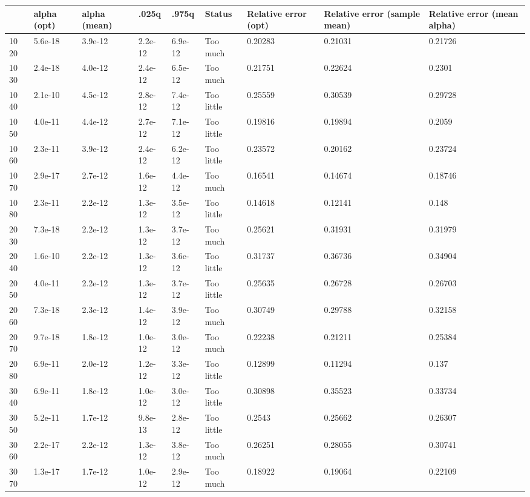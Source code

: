 \begin{tabular}{lllllllll}
& alpha (opt) & alpha (mean) & .025q & .975q & Status & Relative error (opt) & Relative error (sample mean) & Relative error (mean alpha) \\ 
\hline 
10  20 & 5.6e-18 & 3.9e-12 & 2.2e-12 & 6.9e-12 & Too much & 0.20283 & 0.21031 & 0.21726 \\ \hline 
10  30 & 2.4e-18 & 4.0e-12 & 2.4e-12 & 6.5e-12 & Too much & 0.21751 & 0.22624 & 0.2301 \\ \hline 
10  40 & 2.1e-10 & 4.5e-12 & 2.8e-12 & 7.4e-12 & Too little & 0.25559 & 0.30539 & 0.29728 \\ \hline 
10  50 & 4.0e-11 & 4.4e-12 & 2.7e-12 & 7.1e-12 & Too little & 0.19816 & 0.19894 & 0.2059 \\ \hline 
10  60 & 2.3e-11 & 3.9e-12 & 2.4e-12 & 6.2e-12 & Too little & 0.23572 & 0.20162 & 0.23724 \\ \hline 
10  70 & 2.9e-17 & 2.7e-12 & 1.6e-12 & 4.4e-12 & Too much & 0.16541 & 0.14674 & 0.18746 \\ \hline 
10  80 & 2.3e-11 & 2.2e-12 & 1.3e-12 & 3.5e-12 & Too little & 0.14618 & 0.12141 & 0.148 \\ \hline 
20  30 & 7.3e-18 & 2.2e-12 & 1.3e-12 & 3.7e-12 & Too much & 0.25621 & 0.31931 & 0.31979 \\ \hline 
20  40 & 1.6e-10 & 2.2e-12 & 1.3e-12 & 3.6e-12 & Too little & 0.31737 & 0.36736 & 0.34904 \\ \hline 
20  50 & 4.0e-11 & 2.2e-12 & 1.3e-12 & 3.7e-12 & Too little & 0.25635 & 0.26728 & 0.26703 \\ \hline 
20  60 & 7.3e-18 & 2.3e-12 & 1.4e-12 & 3.9e-12 & Too much & 0.30749 & 0.29788 & 0.32158 \\ \hline 
20  70 & 9.7e-18 & 1.8e-12 & 1.0e-12 & 3.0e-12 & Too much & 0.22238 & 0.21211 & 0.25384 \\ \hline 
20  80 & 6.9e-11 & 2.0e-12 & 1.2e-12 & 3.3e-12 & Too little & 0.12899 & 0.11294 & 0.137 \\ \hline 
30  40 & 6.9e-11 & 1.8e-12 & 1.0e-12 & 3.0e-12 & Too little & 0.30898 & 0.35523 & 0.33734 \\ \hline 
30  50 & 5.2e-11 & 1.7e-12 & 9.8e-13 & 2.8e-12 & Too little & 0.2543 & 0.25662 & 0.26307 \\ \hline 
30  60 & 2.2e-17 & 2.2e-12 & 1.3e-12 & 3.8e-12 & Too much & 0.26251 & 0.28055 & 0.30741 \\ \hline 
30  70 & 1.3e-17 & 1.7e-12 & 1.0e-12 & 2.9e-12 & Too much & 0.18922 & 0.19064 & 0.22109 \\ \hline 

\end{tabular}
